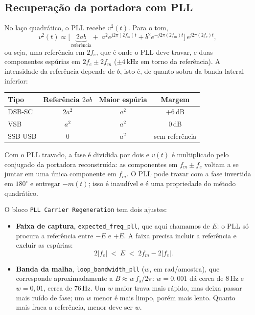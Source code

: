 \documentclass[11pt,a4paper]{article}
\begin{document}
\subsection*{Recuperação da portadora com PLL}

No laço quadrático, o PLL recebe $v^2(t)$. Para o tom,
\begin{equation}
      v^2(t) \propto \Big[\,\underbrace{2ab}_{\text{referência}}
      + \;a^2 e^{j2\pi(2f_m)t} + b^2 e^{-j2\pi(2f_m)t}\Big]\,e^{j2\pi(2f_e)t},
      \label{eq:quad}
\end{equation}
ou seja, uma referência em $2f_e$, que é onde o PLL deve travar, e duas
componentes espúrias em $2f_e \pm 2f_m$ ($\pm 4$\,kHz em torno da referência).
A intensidade da referência depende de $b$, isto é, de quanto sobra da banda
lateral inferior:
\begin{center}
      \begin{tabular}{l c c c}
            \toprule
            \textbf{Tipo} & \textbf{Referência $2ab$} & \textbf{Maior espúria} & \textbf{Margem} \\
            \midrule
            DSB-SC        & $2a^2$                    & $a^2$                  & $+6$\,dB        \\
            VSB           & $a^2$                     & $a^2$                  & $0$\,dB         \\
            SSB-USB       & $0$                       & $a^2$                  & sem referência  \\
            \bottomrule
      \end{tabular}
\end{center}
Com o PLL travado, a fase é dividida por dois e $v(t)$ é multiplicado pelo
conjugado da portadora reconstruída: as componentes em $f_m \pm f_e$ voltam a
se juntar em uma única componente em $f_m$. O PLL pode travar com a fase
invertida em $180^\circ$ e entregar $-m(t)$; isso é inaudível e é uma
propriedade do método quadrático.

O bloco \texttt{PLL Carrier Regeneration} tem dois ajustes:
\begin{itemize}
      \item \textbf{Faixa de captura}, \texttt{expected\_freq\_pll}, que aqui
            chamamos de $E$: o PLL só procura a referência entre $-E$ e $+E$. A
            faixa precisa incluir a referência e excluir as espúrias:
            \begin{equation}
                  2|f_e| \;<\; E \;<\; 2f_m - 2|f_e|.
                  \label{eq:captura}
            \end{equation}
      \item \textbf{Banda da malha}, \texttt{loop\_bandwidth\_pll} ($w$, em
            rad/amostra), que corresponde aproximadamente a
            $B \approx w\,f_s/2\pi$: $w = 0{,}001$ dá cerca de 8\,Hz e $w = 0{,}01$,
            cerca de 76\,Hz. Um $w$ maior trava mais rápido, mas deixa passar mais
            ruído de fase; um $w$ menor é mais limpo, porém mais lento. Quanto mais
            fraca a referência, menor deve ser $w$.
\end{itemize}
\end{document}
